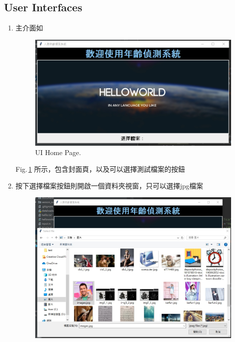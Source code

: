 \documentclass{scrreprt}
\begin{document}
\begin{CJK}{UTF8}{bkai}
\section{User Interfaces}
\vspace{0.9cm}
\begin{enumerate}
    \item 主介面如
    \begin{figure}[htb]
        \begin{center}
            \includegraphics[scale=0.7]{image/UiHomePage.png}%
        \end{center}
        \caption{UI Home Page.}
        \label{fig:1}
    \end{figure}
    Fig.\,\ref{fig:1} 所示，包含封面頁，以及可以選擇測試檔案的按鈕\\
    \vspace{5.7cm}
    \item 按下選擇檔案按鈕則開啟一個資料夾視窗，只可以選擇jpg檔案
    \begin{figure}[htb]
        \begin{center}
            \includegraphics[scale=0.6]{image/UiSelectFile.png}%

\end{center}
\end{figure}
\end{enumerate}
\end{CJK}
\end{document}
